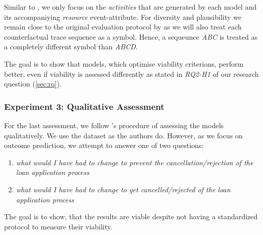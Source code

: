 \documentclass[./../../paper.tex]{subfiles}
\begin{document}
Similar to \citeauthor{hsieh_DiCE4ELInterpretingProcess_2021}, we only focus on the \emph{activities} that are generated by each model and its accompaniying \emph{resource} event-attribute. For diversity and plausibility we remain close to the original evaluation protocol by \citeauthor{hsieh_DiCE4ELInterpretingProcess_2021} as we will also treat each counterfactual trace sequence as a symbol. Hence, a sequeunce \emph{ABC} is treated as a completely different symbol than \emph{ABCD}.

The goal is to show that models, which optimise viability criterions, perform better, even if viability is assessed differently as stated in \emph{RQ2-H1} of our research question (\autoref{sec:rq}). 

\subsubsection{Experiment 3: Qualitative Assessment}
For the last assessment, we follow \citeauthor{hsieh_DiCE4ELInterpretingProcess_2021}'s procedure of assessing the models qualitatively. We use the dataset as the authors do.  However, as we focus on outcome prediction, we attempt to answer one of two questions: 

\begin{enumerate}
    \item \emph{what would I have had to change to prevent the cancellation/rejection of the loan application process}
    \item \emph{what would I have had to change to get cancelled/rejected of the loan application process}
\end{enumerate}

\noindent The goal is to show, that the results are viable despite not having a standardized protocol to measure their viability.
\end{document}
